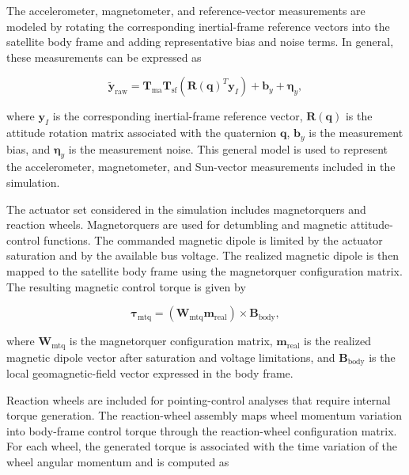 The accelerometer, magnetometer, and reference-vector measurements are modeled by rotating the corresponding inertial-frame reference vectors into the satellite body frame and adding representative bias and noise terms. In general, these measurements can be expressed as

\begin{equation}
    \tilde{\mathbf{y}}_{\mathrm{raw}}
    =
    \mathbf{T}_{\mathrm{ma}}
    \mathbf{T}_{\mathrm{sf}}
    \left(
        \mathbf{R}(\mathbf{q})^{T}
        \mathbf{y}_{I}
    \right)
    +
    \mathbf{b}_{y}
    +
    \boldsymbol{\eta}_{y},
    \label{eq:adcs_reference_vector_measurement}
\end{equation}

where \(\mathbf{y}_{I}\) is the corresponding inertial-frame reference vector, \(\mathbf{R}(\mathbf{q})\) is the attitude rotation matrix associated with the quaternion \(\mathbf{q}\), \(\mathbf{b}_{y}\) is the measurement bias, and \(\boldsymbol{\eta}_{y}\) is the measurement noise. This general model is used to represent the accelerometer, magnetometer, and Sun-vector measurements included in the simulation.

The actuator set considered in the simulation includes magnetorquers and reaction wheels. Magnetorquers are used for detumbling and magnetic attitude-control functions. The commanded magnetic dipole is limited by the actuator saturation and by the available bus voltage. The realized magnetic dipole is then mapped to the satellite body frame using the magnetorquer configuration matrix. The resulting magnetic control torque is given by

\begin{equation}
    \boldsymbol{\tau}_{\mathrm{mtq}}
    =
    \left(
        \mathbf{W}_{\mathrm{mtq}}
        \mathbf{m}_{\mathrm{real}}
    \right)
    \times
    \mathbf{B}_{\mathrm{body}},
    \label{eq:adcs_mtq_torque}
\end{equation}

where \(\mathbf{W}_{\mathrm{mtq}}\) is the magnetorquer configuration matrix, \(\mathbf{m}_{\mathrm{real}}\) is the realized magnetic dipole vector after saturation and voltage limitations, and \(\mathbf{B}_{\mathrm{body}}\) is the local geomagnetic-field vector expressed in the body frame.

Reaction wheels are included for pointing-control analyses that require internal torque generation. The reaction-wheel assembly maps wheel momentum variation into body-frame control torque through the reaction-wheel configuration matrix. For each wheel, the generated torque is associated with the time variation of the wheel angular momentum and is computed as

